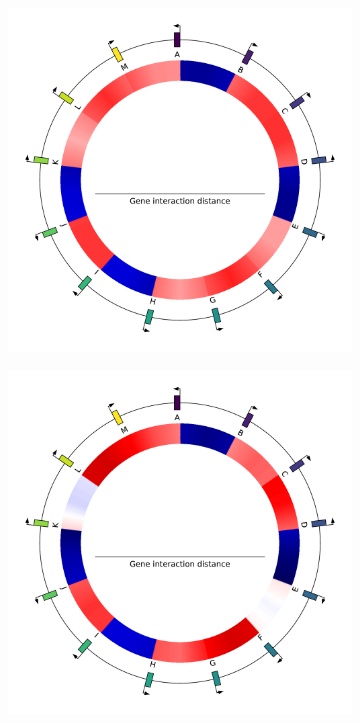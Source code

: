 \begin{figure}[H]
\begin{subfigure}[t]{0.24\textwidth}
\label{subfig:alife:genome_2}
\end{subfigure}
\hspace{-3mm}
\begin{subfigure}[t]{0.24\textwidth}
\includegraphics[width=\textwidth]{alife/img/13genes_genome_1.pdf}
\label{subfig:alife:genome_1}
\end{subfigure}
\hspace{-3mm}
\begin{subfigure}[t]{0.24\textwidth}
\includegraphics[width=\textwidth]{alife/img/13genes_genome_0.pdf}
\label{subfig:alife:genome_0}
\end{subfigure}
\vspace{-3mm}


\end{figure}
